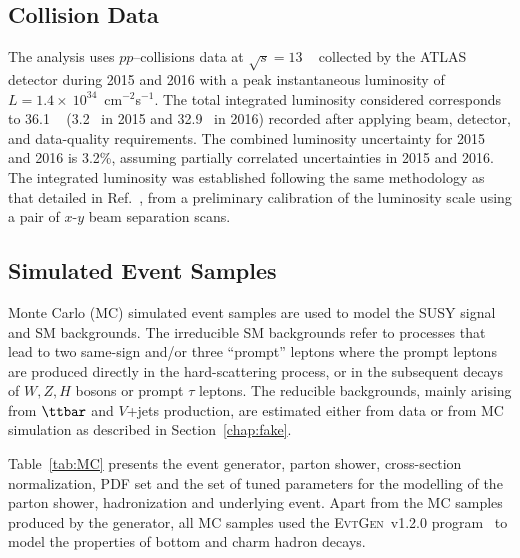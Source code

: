 \subsection{Collision Data}
The analysis uses $pp$--collisions data at $\sqrt s=13$ \TeV~ 
collected by the ATLAS detector during 2015 and 2016
 with a peak instantaneous luminosity of 
$L=1.4\times~10^{34}$~cm$^{-2}$s$^{-1}$.
The total integrated luminosity considered corresponds to 36.1 \ifb~ 
(3.2 \ifb~in 2015 and 32.9 \ifb~in 2016) recorded 
after applying beam, detector, and data-quality requirements.
The combined luminosity uncertainty for 2015 and 2016 is 3.2\%, 
assuming partially correlated uncertainties in 2015 and 2016.
The integrated luminosity was established following the same methodology as 
that detailed in Ref.~\cite{Aaboud:2016hhf},
from a preliminary calibration of the luminosity scale using a pair of $x$-$y$ 
beam separation scans.%

\subsection{Simulated Event Samples}

Monte Carlo (MC) simulated event samples are used to model the SUSY signal 
and SM backgrounds. 
The irreducible SM backgrounds refer to processes that lead to two 
same-sign and/or three ``prompt'' leptons where the prompt leptons
are produced directly in the hard-scattering process, 
or in the subsequent decays 
of $W,Z,H$ bosons or prompt $\tau$ leptons. 
The reducible backgrounds, mainly 
arising from $\ttbar$ and $V$+jets production, are estimated either from data 
or from MC simulation as described in Section~\ref{chap:fake}. 

Table~\ref{tab:MC} presents the event generator, parton shower, cross-section 
normalization, PDF
set and the set of tuned parameters for the modelling of the parton shower, 
hadronization and underlying event. 
Apart from the MC samples produced by the \SHERPA generator, all MC samples
used the \textsc{EvtGen}~v1.2.0 program~\cite{EvtGen} 
to model the properties of bottom and charm hadron decays. 

